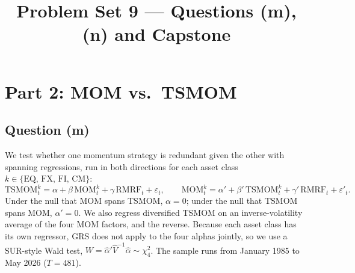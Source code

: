 \documentclass[11pt]{article}
\title{Problem Set 9 --- Questions (m), (n) and Capstone}
\date{}
\begin{document}
\maketitle
\vspace{-3em}


\section*{Part 2: MOM vs.\ TSMOM}
\subsection*{Question (m)}

We test whether one momentum strategy is redundant given the other with spanning
regressions, run in both directions for each asset class $k\in\{\text{EQ, FX, FI, CM}\}$:
\[
\text{TSMOM}^k_t=\alpha+\beta\,\text{MOM}^k_t+\gamma\,\text{RMRF}_t+\varepsilon_t,
\qquad
\text{MOM}^k_t=\alpha'+\beta'\,\text{TSMOM}^k_t+\gamma'\,\text{RMRF}_t+\varepsilon'_t .
\]
Under the null that MOM spans TSMOM, $\alpha=0$; under the null that TSMOM spans MOM,
$\alpha'=0$. We also regress diversified TSMOM on an inverse-volatility average of the
four MOM factors, and the reverse. Because each asset class has its own regressor,
GRS does not apply to the four alphas jointly, so we use a SUR-style Wald test,
$W=\hat\alpha'\hat V^{-1}\hat\alpha\sim\chi^2_4$. The sample runs from January 1985 to
May 2026 ($T=481$).
\end{document}
